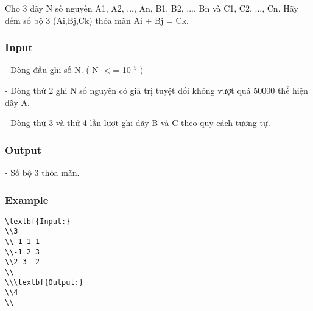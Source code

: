 



   Cho 3 dãy N số nguyên A1, A2, ..., An, B1, B2, ..., Bn và C1, C2, ..., Cn. Hãy đếm số bộ 3 (Ai,Bj,Ck) thỏa mãn Ai + Bj = Ck.  

\subsubsection{   Input  }

   - Dòng đầu ghi số N. ( N $<$= 10   $^    5   $   )  

   - Dòng thứ 2 ghi N số nguyên có giá trị tuyệt đối không vượt quá 50000 thể hiện dãy A.  

   - Dòng thứ 3 và thứ 4 lần lượt ghi dãy B và C theo quy cách tương tự.  

\subsubsection{   Output  }

   - Số bộ 3 thỏa mãn.  

\subsubsection{   Example  }
\begin{verbatim}
\textbf{Input:}
\\3
\\-1 1 1
\\-1 2 3
\\2 3 -2
\\
\\\textbf{Output:}
\\4
\\\end{verbatim}